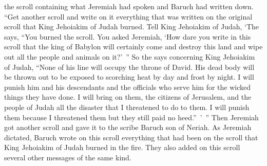 {the scroll
containing what
Jeremiah
had spoken
and Baruch
had
written down.
“Get
another
scroll
and write
on
it everything
that
was written on
the original
scroll
that
King
Jehoiakim
of Judah
burned.
Tell King
Jehoiakim
of Judah,
‘The
{}
says,
“You
burned
the scroll.
You asked
Jeremiah, ‘How dare you write
in
this
scroll that the king
of Babylon
will certainly
come
and destroy
this
land
and wipe out
all the people
and animals on it?’ ”
So
the {}
says
concerning
King
Jehoiakim
of Judah,
“None
of his line will occupy
the throne
of David.
His dead body
will be
thrown
out to be exposed to scorching heat
by day
and frost
by night.
I will punish
him
and his descendants
and the officials
who serve him for the wicked things they have done. I will bring
on
them,
the citizens
of Jerusalem,
and the people
of Judah
all
the disaster
that
I threatened
to do to
them. I will punish them because I threatened them but they still paid no
heed.” ’ ”
Then
Jeremiah
got
another
scroll
and gave
it to
the scribe
Baruch
son
of Neriah.
As Jeremiah
dictated,
Baruch wrote
on
this
scroll
everything
that had
been on the scroll
that
King
Jehoiakim
of Judah
burned
in the fire.
They
also added
on this scroll several
other messages
of the same kind.

\par }
